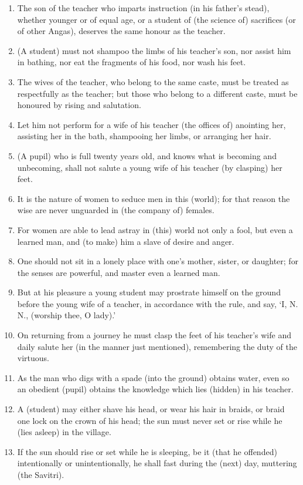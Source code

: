 \begin{enumerate}
\item The son of the teacher who imparts instruction (in his father's stead), whether younger or of equal age, or a student of (the science of) sacrifices (or of other Angas), deserves the same honour as the teacher.
\item (A student) must not shampoo the limbs of his teacher's son, nor assist him in bathing, nor eat the fragments of his food, nor wash his feet.
\item The wives of the teacher, who belong to the same caste, must be treated as respectfully as the teacher; but those who belong to a different caste, must be honoured by rising and salutation.
\item Let him not perform for a wife of his teacher (the offices of) anointing her, assisting her in the bath, shampooing her limbs, or arranging her hair.
\item (A pupil) who is full twenty years old, and knows what is becoming and unbecoming, shall not salute a young wife of his teacher (by clasping) her feet.
\item It is the nature of women to seduce men in this (world); for that reason the wise are never unguarded in (the company of) females.
\item For women are able to lead astray in (this) world not only a fool, but even a learned man, and (to make) him a slave of desire and anger.
\item One should not sit in a lonely place with one's mother, sister, or daughter; for the senses are powerful, and master even a learned man.
\item But at his pleasure a young student may prostrate himself on the ground before the young wife of a teacher, in accordance with the rule, and say, `I, N. N., (worship thee, O lady).'
\item On returning from a journey he must clasp the feet of his teacher's wife and daily salute her (in the manner just mentioned), remembering the duty of the virtuous.
\item As the man who digs with a spade (into the ground) obtains water, even so an obedient (pupil) obtains the knowledge which lies (hidden) in his teacher.
\item A (student) may either shave his head, or wear his hair in braids, or braid one lock on the crown of his head; the sun must never set or rise while he (lies asleep) in the village.
\item If the sun should rise or set while he is sleeping, be it (that he offended) intentionally or unintentionally, he shall fast during the (next) day, muttering (the Savitri).

\end{enumerate}
